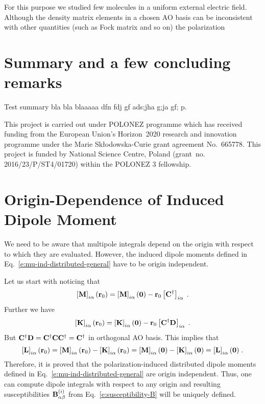 \documentclass[aip,graphicx]{revtex4-1}
\begin{document}
For this purpose we studied few molecules
in a uniform external electric field. Although the density matrix elements in a chosen AO basis
can be inconsistent with other quantities (such as Fock matrix and so on) the polarization 


\section{\label{s:5}Summary and a few concluding remarks}
Test summary bla bla blaaaaa dfn fdj gf ads;jha g;ja gf; p.

\begin{acknowledgments}
This project is carried out under POLONEZ programme which has received funding from the European Union's
Horizon~2020 research and innovation programme under the Marie Skłodowska-Curie grant agreement 
No.~665778. This project is funded by National Science Centre, Poland 
(grant~no. 2016/23/P/ST4/01720) within the POLONEZ 3 fellowship.
\end{acknowledgments}

%
\appendix

\section{\label{a:orig-dep} Origin-Dependence of Induced Dipole Moment}

We need to be aware that multipole integrals depend on the origin with respect to which they are evaluated.
However, the induced dipole moments defined in Eq.~\eqref{e:mu-ind-distributed-general} 
have to be origin independent. 

Let us start with noticing that
%
\begin{equation}
 \left[ {\bf M} \right]_{i\alpha} ({\bf r}_0) 
 = \left[ {\bf M} \right]_{i\alpha} ({\bf 0}) - {\bf r}_0 \left[ {\bf C}^\dagger \right]_{i\alpha}  \;.
\end{equation}
%
Further we have
%
\begin{equation}
 \left[ {\bf K} \right]_{i\alpha} ({\bf r}_0) 
 = \left[ {\bf K} \right]_{i\alpha} ({\bf 0}) - {\bf r}_0 \left[ {\bf C}^\dagger {\bf D} \right]_{i\alpha} \;.
\end{equation}
%
But ${\bf C}^\dagger {\bf D}={\bf C}^\dagger {\bf C} {\bf C}^\dagger={\bf C}^\dagger$ in orthogonal
AO basis. This implies that
%
\begin{equation}
   \left[ {\bf L} \right]_{i\alpha} ({\bf r}_0) 
 = \left[ {\bf M} \right]_{i\alpha} ({\bf r}_0) - \left[ {\bf K} \right]_{i\alpha} ({\bf r}_0)
 = \left[ {\bf M} \right]_{i\alpha} ({\bf 0})   - \left[ {\bf K} \right]_{i\alpha} ({\bf 0})
 = \left[ {\bf L} \right]_{i\alpha} ({\bf 0}) \;.
\end{equation}
%
Therefore, it is proved that the polarization\hyp{}induced distributed dipole moments 
defined in Eq.~\eqref{e:mu-ind-distributed-general} 
are origin independent.
Thus, one can compute dipole integrals with respect to any origin and resulting
susceptibilities ${\bf B}_{\alpha\beta}^{(i)}$ from Eq.~\eqref{e:susceptibility-B} will be uniquely defined.
\end{document}
